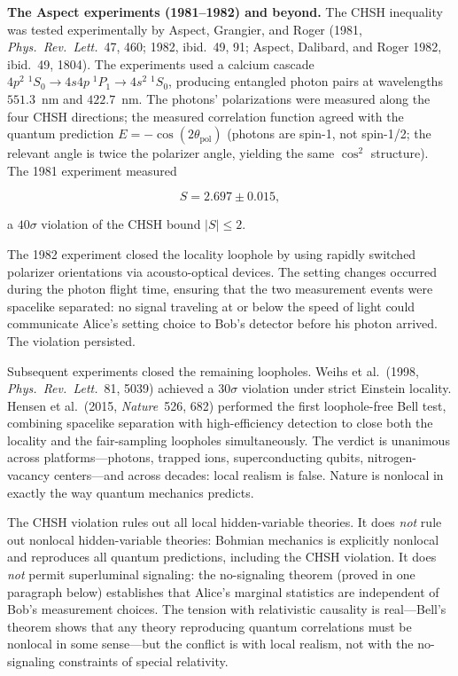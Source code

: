 \medskip\noindent\textbf{The Aspect experiments (1981--1982) and beyond.}
The CHSH inequality was tested experimentally by Aspect, Grangier, and Roger (1981, \textit{Phys.\ Rev.\ Lett.}\ 47, 460; 1982, ibid.\ 49, 91; Aspect, Dalibard, and Roger 1982, ibid.\ 49, 1804). The experiments used a calcium cascade $4p^2\;{}^1S_0 \to 4s4p\;{}^1P_1 \to 4s^2\;{}^1S_0$, producing entangled photon pairs at wavelengths $551.3$~nm and $422.7$~nm. The photons' polarizations were measured along the four CHSH directions; the measured correlation function agreed with the quantum prediction $E = -\cos(2\theta_{\text{pol}})$ (photons are spin-1, not spin-1/2; the relevant angle is twice the polarizer angle, yielding the same $\cos^2$ structure). The 1981 experiment measured
\begin{linenomath}
\begin{equation}
S = 2.697 \pm 0.015,
\end{equation}
\end{linenomath}
a $40\sigma$ violation of the CHSH bound $\lvert S\rvert \le 2$.

The 1982 experiment closed the locality loophole by using rapidly switched polarizer orientations via acousto-optical devices. The setting changes occurred during the photon flight time, ensuring that the two measurement events were spacelike separated: no signal traveling at or below the speed of light could communicate Alice's setting choice to Bob's detector before his photon arrived. The violation persisted.

Subsequent experiments closed the remaining loopholes. Weihs et al.\ (1998, \textit{Phys.\ Rev.\ Lett.}\ 81, 5039) achieved a $30\sigma$ violation under strict Einstein locality. Hensen et al.\ (2015, \textit{Nature}\ 526, 682) performed the first loophole-free Bell test, combining spacelike separation with high-efficiency detection to close both the locality and the fair-sampling loopholes simultaneously. The verdict is unanimous across platforms---photons, trapped ions, superconducting qubits, nitrogen-vacancy centers---and across decades: local realism is false. Nature is nonlocal in exactly the way quantum mechanics predicts.

\begin{note}
The CHSH violation rules out all local hidden-variable theories. It does \textit{not} rule out nonlocal hidden-variable theories: Bohmian mechanics is explicitly nonlocal and reproduces all quantum predictions, including the CHSH violation. It does \textit{not} permit superluminal signaling: the no-signaling theorem (proved in one paragraph below) establishes that Alice's marginal statistics are independent of Bob's measurement choices. The tension with relativistic causality is real---Bell's theorem shows that any theory reproducing quantum correlations must be nonlocal in some sense---but the conflict is with local realism, not with the no-signaling constraints of special relativity.
\end{note}

